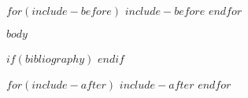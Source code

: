 \documentclass[a4paper, 11pt]{article}
\begin{document}
$for(include-before)$
$include-before$
$endfor$

$body$

$if(bibliography)$
\printbibliography[title=References]
$endif$

$for(include-after)$
$include-after$
$endfor$
\end{document}
